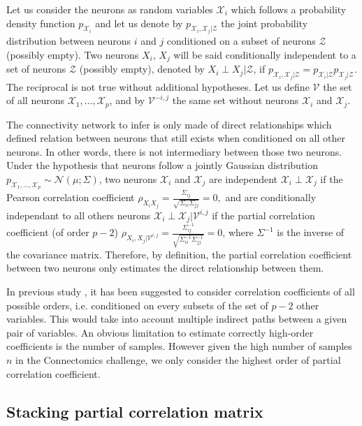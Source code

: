 \documentclass[wcp]{jmlr}
\begin{document}
Let us consider the neurons as random variables $\mathcal{X}_i$ which follows
a probability density function $p_{\mathcal{X}_i}$ and let us denote by
$p_{\mathcal{X}_i,\mathcal{X}_j|\mathcal{Z}}$ the joint probability
distribution between neurons $i$ and $j$ conditioned on a subset of neurons
$\mathcal{Z}$ (possibly empty). Two neurons $X_i$, $X_j$
will be said conditionally independent to a set of neurons
$\mathcal{Z}$ (possibly empty), denoted by  $X_i \perp X_j | \mathcal{Z}$,  if
$p_{\mathcal{X}_i,\mathcal{X}_j|\mathcal{Z}} = p_{\mathcal{X}_i|\mathcal{Z}}
p_{\mathcal{X}_j|\mathcal{Z}}$. The reciprocal is not true without
additional hypotheses.  Let us define $\mathcal{V}$ the set of all
neurons $\mathcal{X}_1, \dots, \mathcal{X}_p$, and by $\mathcal{V}^{-i,j}$ the
same set without neurons $\mathcal{X}_i$ and $\mathcal{X}_j$.

The connectivity network to infer is only made of direct relationships
which defined relation between neurons that still exists when
conditioned on all other neurons. In other words, there is not intermediary
between those two neurons. Under the hypothesis that neurons follow a jointly
Gaussian distribution $p_{\mathcal{X}_1, \dots, \mathcal{X}_p} \sim
\mathcal{N}(\mu; \Sigma)$, two neurons $\mathcal{X}_i$ and $\mathcal{X}_j$ are
independent $\mathcal{X}_i\perp \mathcal{X}_j$ if the Pearson correlation
coefficient $\rho_{X_iX_j} = \frac{\Sigma_{ij}}{\sqrt{\Sigma_{ii}
\Sigma_{jj}}} = 0,$ and are conditionally independant to all others neurons
$\mathcal{X}_i \perp \mathcal{X}_j |\mathcal{V}^{i,j}$ if the partial
correlation coefficient (of order $p-2$) $\rho_{X_i, X_j | \mathcal{V}^{i,j}}
= \frac{\Sigma^{-1}_{ij}}{\sqrt{\Sigma^{-1}_{ii} \Sigma^{-1}_{jj}}} = 0$,
where $\Sigma^{-1}$ is the inverse of the covariance matrix.
Therefore, by definition, the partial correlation coefficient between two
neurons only estimates the direct relationship between them.

In previous study \cite{shipley2002cause}, it has been suggested to
consider correlation coefficients of all possible orders,
i.e. conditioned on every subsets of the set of $p-2$ other variables. This
would take into account multiple indirect paths between a given pair of
variables. An obvious limitation to estimate correctly high-order coefficients
is the number of samples. However given the high number of samples $n$
in the Connectomics challenge, we only consider the highest order of partial
correlation coefficient.

\subsection{Stacking partial correlation matrix}
\label{sec:stacking}
\end{document}
